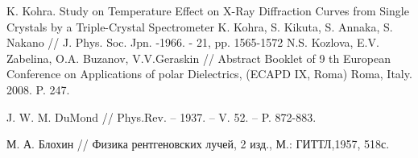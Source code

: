 \begin{thebibliography}{99}
      K. Kohra. Study on Temperature Effect on X-Ray
       Diffraction Curves from Single Crystals by a Triple-Crystal Spectrometer
       K. Kohra, S. Kikuta, S. Annaka, S. Nakano // J. Phys. Soc. Jpn. -1966. - 21, pp. 1565-1572
       N.S. Kozlova, E.V. Zabelina, O.A. Buzanov, V.V.Geraskin //
       Abstract Booklet of 9 th European Conference on Applications of
        polar Dielectrics, (ECAPD IX, Roma) Roma, Italy. 2008. P. 247.

    J. W. M. DuMond // Phys.Rev. – 1937. – V. 52. – P. 872-883.

    М. А. Блохин // Физика рентгеновских лучей, 2 изд., М.: ГИТТЛ,1957, 518с.

\end{thebibliography}
